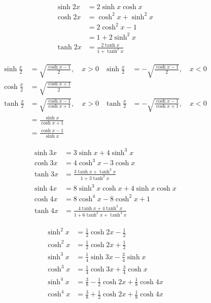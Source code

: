 \begin{align*}
  \sinh 2x &= 2\sinh x\cosh x \\
  \cosh 2x &= \cosh^{2}x+\sinh^{2}x \\
           &= 2\cosh^{2}x -1 \\
           &= 1+2\sinh^{2}x \\
  \tanh 2x &= \frac{2\tanh x}{1+\tanh^{2}x}
\end{align*}

\begin{align*}
  \sinh \frac{x}{2} &= \sqrt{\frac{\cosh x -1}{2}},\quad x>0 & \sinh \frac{x}{2} &= -\sqrt{\frac{\cosh x -1}{2}},\quad x<0 \\
  \cosh \frac{x}{2} &= \sqrt{\frac{\cosh x+1}{2}} \\
  \tanh \frac{x}{2} &= \sqrt{\frac{\cosh x - 1 }{\cosh x + 1}},\quad x>0 & \tanh \frac{x}{2} &= -\sqrt{\frac{\cosh x - 1 }{\cosh x + 1}},\quad x<0 \\
  &=\frac{\sinh x}{\cosh x+1} \\
  &=\frac{\cosh x -1}{\sinh x}
\end{align*}


\begin{align*}
  \sinh 3x &= 3\sinh x + 4\sinh^{3}x \\
  \cosh 3x &= 4\cosh^{3}x-3\cosh x \\
  \tanh 3x &= \frac{3\tanh x + \tanh^{3}x}{1+3\tanh^{2}x} \\
  \sinh 4x &= 8\sinh^{3}x\cosh x + 4\sinh x \cosh x \\
  \cosh 4x &= 8\cosh^{4}x-8\cosh^{2}x+1 \\
  \tanh 4x &= \frac{4\tanh x + 4\tanh^{3}x}{1+6\tanh^{2}x+\tanh^{4}x}
\end{align*}


\begin{align*}
  \sinh^{2}x &=\frac{1}{2}\cosh 2x -\frac{1}{2} \\
  \cosh^{2}x &=\frac{1}{2}\cosh 2x +\frac{1}{2} \\
  \sinh^{3}x &=\frac{1}{4}\sinh 3x -\frac{3}{4}\sinh x \\
  \cosh^{3}x &=\frac{1}{4}\cosh 3x +\frac{3}{4}\cosh x \\
  \sinh^{4}x &=\frac{3}{8}-\frac{1}{2}\cosh 2x + \frac{1}{8}\cosh 4x \\
  \cosh^{4}x &=\frac{3}{8}+\frac{1}{2}\cosh 2x + \frac{1}{8}\cosh 4x
\end{align*}


